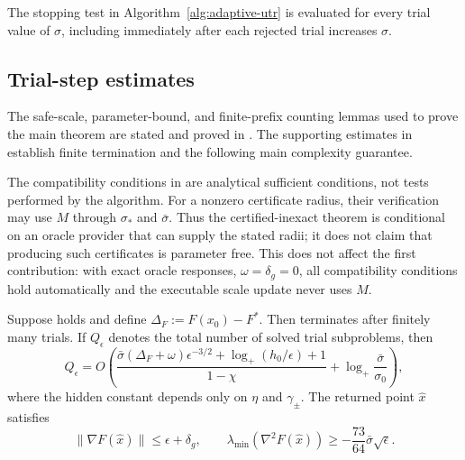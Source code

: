 \documentclass{article}
\begin{document}
The stopping test in Algorithm~\ref{alg:adaptive-utr} is evaluated for
every trial value of $\sigma$, including immediately after each rejected
trial increases $\sigma$.

\subsection{Trial-step estimates}
The safe-scale, parameter-bound, and finite-prefix counting lemmas used
to prove the main theorem are stated and proved in
.
The supporting estimates in  establish finite
termination and the following main complexity guarantee.

\begin{remark}
\label{rem:adaptive-certificate-parameters}
The compatibility conditions in
 are analytical sufficient
conditions, not tests performed by the algorithm.  For a nonzero
certificate radius, their verification may use $M$ through
$\sigma_*$ and $\bar\sigma$.  Thus the certified-inexact theorem is
conditional on an oracle provider that can supply the stated radii; it
does not claim that producing such certificates is parameter free.
This does not affect the first contribution: with exact oracle
responses, $\omega=\delta_g=0$, all compatibility conditions hold
automatically and the executable scale update never uses $M$.
\end{remark}

\begin{theorem}
\label{thm:total-complexity}
Suppose  holds and define
$\Delta_F:=F(x_0)-F^*$.  Then
 terminates after finitely many trials.  If
$Q_\epsilon$ denotes the total number of solved trial subproblems, then
\begin{equation}\label{eq:adaptive-total-big-o}
 Q_\epsilon=O\!\left(
 \frac{\bar\sigma(\Delta_F+\omega)\epsilon^{-3/2}
       +\log_+(h_0/\epsilon)+1}{1-\chi}
 +\log_+\!\frac{\bar\sigma}{\sigma_0}
 \right),
\end{equation}
where the hidden constant depends only on $\eta$ and
$\gamma_\pm$.  The returned point $\widehat x$ satisfies
\begin{equation}\label{eq:return-guarantee}
    \|\nabla F(\widehat x)\|\le\epsilon+\delta_g,
    \qquad
    \lambda_{\min}(\nabla^2 F(\widehat x))
    \ge-\frac{73}{64}\bar\sigma\sqrt\epsilon.
\end{equation}
\end{theorem}
\end{document}
